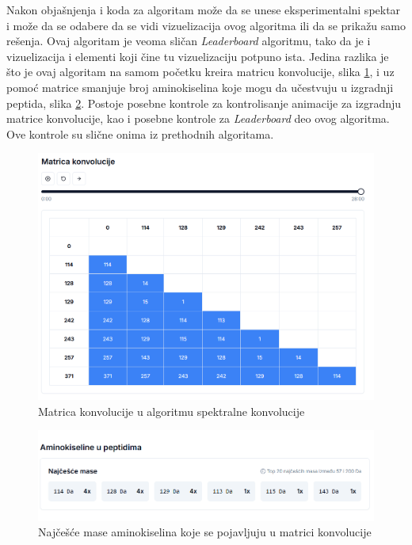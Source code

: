 \documentclass[12pt,oneside]{memoir}
\begin{document}
Nakon objašnjenja i koda za algoritam može da se unese eksperimentalni spektar i može da se odabere da se vidi vizuelizacija ovog algoritma ili da se prikažu samo rešenja. Ovaj algoritam je veoma sličan \emph{Leaderboard} algoritmu, tako da je i vizuelizacija i elementi koji čine tu vizuelizaciju potpuno ista. Jedina razlika je što je ovaj algoritam na samom početku kreira matricu konvolucije, slika \ref{fig:convolution_2}, i uz pomoć matrice smanjuje broj aminokiselina koje mogu da učestvuju u izgradnji peptida, slika \ref{fig:convolution_3}. Postoje posebne kontrole za kontrolisanje animacije za izgradnju matrice konvolucije, kao i posebne kontrole za \emph{Leaderboard} deo ovog algoritma. Ove kontrole su slične onima iz prethodnih algoritama.

\begin{figure}[H]
\centering
\includegraphics[width=1\textwidth]{images/convolution_2.png}
\caption{Matrica konvolucije u algoritmu spektralne konvolucije}
\label{fig:convolution_2}
\end{figure}

\begin{figure}[H]
\centering
\includegraphics[width=1\textwidth]{images/convolution_3.png}
\caption{Najčešće mase aminokiselina koje se pojavljuju u matrici konvolucije}
\label{fig:convolution_3}
\end{figure}
\end{document}
